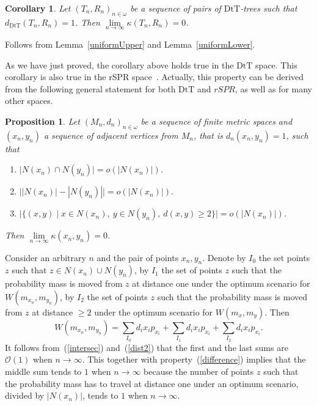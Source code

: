 \documentclass{amsart}
\newtheorem{proposition}[lemma]{Proposition}
\newtheorem{corollary}[lemma]{Corollary}
\newcommand{\dts}{\mathrm{DtT}}
\renewcommand{\O}{\mathcal{O}}
\begin{document}
\begin{corollary}\label{flatInLimDTS}
Let $(T_n,R_n)_{n\in\omega}$ be a sequence of pairs of $\dts$-trees such that
$d_{\dts}(T_n,R_n) = 1$. Then $\lim\limits_{n \to \infty}\kappa(T_n,R_n) = 0$.
\end{corollary}

\proof
Follows from Lemma~\ref{uniformUpper} and Lemma~\ref{uniformLower}.
\endproof

As we have just proved, the corollary above holds true in the $\dts$ space. 
This corollary is also true in the rSPR space~\cite{Whidden2015-es}.
Actually, this property can be derived from the following general statement 
for both $\dts$ and $rSPR$, as well as for many other spaces. 

\begin{proposition}\label{flatInLimGen}
Let $(M_n,d_n)_{n \in \omega}$ be a sequence of finite metric spaces and 
$(x_n, y_n)$ a sequence of adjacent vertices from $M_n$, 
that is $d_n(x_n,y_n) = 1$, such that 
\begin{enumerate}[(1)]
\item\label{intersec} $\big|N(x_n) \cap N(y_n)\big| = o(|N(x_n)|).$ 
\item\label{difference} $\big||N(x_n)| - |N(y_n)|\big| = o(|N(x_n)|).$ 
\item\label{dist2} $\big|\{(x,y) \mid 
	x \in N(x_n),~ y \in N(y_n),~ d(x, y) \geq 2\}\big| = o(|N(x_n)|).$
\end{enumerate}

Then $\lim\limits_{n \to \infty} \kappa(x_n, y_n) = 0$. 
\end{proposition}

\proof
Consider an arbitrary $n$ and the pair of points $x_n,y_n$. Denote by $I_0$ the
set points $z$ such that $z \in N(x_n) \cup N(y_n)$, by $I_1$ the set of points
$z$ such that the probability mass is moved from $z$ at distance one under the
optimum scenario for $W(m_{x_n},m_{y_n})$, by $I_2$ the set of points $z$ such that 
the probability mass is moved from $z$ at distance $\geq 2$ under the optimum 
scenario for $W(m_x,m_y)$. Then 
\[
W(m_{x_n},m_{y_n}) = \sum_{I_0} d_i x_i p_{x_i} + \sum_{I_1} d_i x_i p_{x_i} + 
\sum_{I_2} d_i x_i p_{x_i}.
\]
It follows from~(\ref{intersec}) and~(\ref{dist2}) that the first and the last sums
are $\O(1)$ when $n\to\infty$. This together with property~(\ref{difference}) 
implies that the middle sum tends to $1$ when $n\to\infty$ because the number of
points $z$ such that the probability mass has to travel at distance one under an
optimum scenario, divided by $|N(x_n)|$, tends to $1$ when $n\to\infty$. 
\endproof
\end{document}
